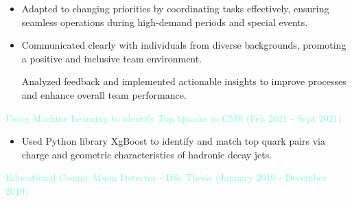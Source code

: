 \documentclass[10pt,a4paper,ragged2e,withhyper]{altacv}
\begin{document}
\begin{paracol}{2}
\begin{itemize}
    \item Adapted to changing priorities by coordinating tasks effectively, ensuring seamless operations during high-demand periods and special events.

    \item Communicated clearly with individuals from diverse backgrounds, promoting a positive and inclusive team environment.

    Analyzed feedback and implemented actionable insights to improve processes and enhance overall team performance.
\end{itemize}





\textcolor{Aquamarine}{Using Machine Learning to identify Top Quarks in CMS (Feb 2021 - Sept 2021)}
\begin{itemize}
    \item Used Python library XgBoost to identify and match top quark pairs via charge and geometric characteristics of  hadronic decay jets.
\end{itemize}
\textcolor{Aquamarine}{Educational Cosmic Muon Detector - BSc Thesis (January 2019 - December 2019)}
\switchcolumn


\\
\\
\\



\\


\medskip





\end{paracol}
\end{document}

